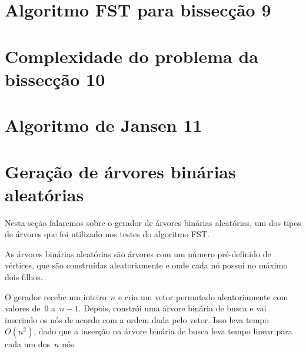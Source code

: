 \documentclass[a4paper,12pt]{article}
\begin{document}
\newpage
\section {Algoritmo FST para bissecção 9}
	


\section {Complexidade do problema da bissecção 10}



\section {Algoritmo de Jansen 11}



\newpage

\section {Geração de árvores binárias aleatórias}
	Nesta seção falaremos sobre o gerador de árvores binárias aleatórias, um dos tipos de árvores que foi utilizado nos
	testes do algoritmo FST.

	As árvores binárias aleatórias são árvores com um número
	pré-definido de vértices, que são construídas
	aleatoriamente e onde cada nó possui no máximo dois filhos.

	O gerador recebe um inteiro~$n$ e cria um vetor permutado
	aleatoriamente com valores de~$0$ a~$n-1$.
	Depois, constrói uma árvore binária de busca e vai
	inserindo os nós de acordo com a ordem dada pelo vetor.
	Isso leva tempo~$O(n^2)$, dado que a inserção na 
	árvore binária de busca leva tempo linear para cada um 
	dos~$n$ nós.
\end{document}
